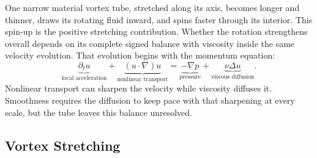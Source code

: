 
One narrow material vortex tube, stretched along its axis, becomes longer and thinner, draws its rotating fluid inward, and spins faster through its interior. This spin-up is the positive stretching contribution. Whether the rotation strengthens overall depends on its complete signed balance with viscosity inside the same velocity evolution. That evolution begins with the momentum equation:
\[
  \underbrace{\partial_t u}_{\text{local acceleration}}
  +
  \underbrace{(u\cdot\nabla)u}_{\text{nonlinear transport}}
  =
  \underbrace{-\nabla p}_{\text{pressure}}
  +
  \underbrace{\nu\Delta u}_{\text{viscous diffusion}}.
\]
Nonlinear transport can sharpen the velocity while viscosity diffuses it. Smoothness requires the diffusion to keep pace with that sharpening at every scale, but the tube leaves this balance unresolved.

\subsection{Vortex Stretching}\label{sub:ThePerfectlyStretchingVortex}

